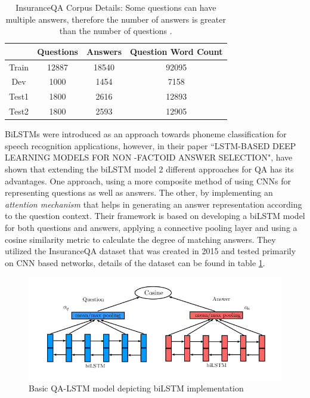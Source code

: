 \documentclass[a4paper,12pt]{report}
\begin{document}
             \begin{table}[h!]
              \centering
                \begin{tabular}{|c|c|c|c|}
                    \hline
                     & Questions & Answers & Question Word Count \\
                    \hline
                    Train & 12887 & 18540 & 92095 \\
                    \hline
                    Dev & 1000 & 1454& 7158 \\
                    \hline
                    Test1 & 1800 & 2616 & 12893 \\
                    \hline
                    Test2 & 1800 & 2593 & 12905 \\
                    \hline
                \end{tabular}
                \caption{InsuranceQA Corpus Details: Some questions can have multiple answers, therefore the number of answers is greater than the number of questions \citep{lstmInsuranceQA}.}\label{lstmInsuranceQATable}
            \end{table}

            BiLSTMs were introduced as an approach towards phoneme classification for speech recognition applications, however, in their paper ``LSTM-BASED DEEP LEARNING MODELS FOR NON -FACTOID ANSWER SELECTION", \citep{lstmhaighextractive} have shown that extending the biLSTM model 2 different approaches for QA has its advantages. One approach, using a more composite method of using CNNs for representing questions as well as answers. The other, by implementing an \textit{attention mechanism} that helps in generating an answer representation according to the question context.
            Their framework is based on developing a biLSTM model for both questions and answers, applying a connective pooling layer and using a cosine similarity metric to calculate the degree of matching answers. They utilized the InsuranceQA\citep{lstmInsuranceQA} dataset that was created in 2015 and tested primarily on CNN based networks, details of the dataset can be found in table \ref{lstmInsuranceQATable}.

            \begin{figure}
            	\centering
            	\includegraphics[scale=0.4]{../images/lstm-bilstmhaig.png}
            	\caption{Basic QA-LSTM model depicting biLSTM implementation \citep{lstmhaighextractive}}\label{lstmhaig}
            \end{figure}
\end{document}
